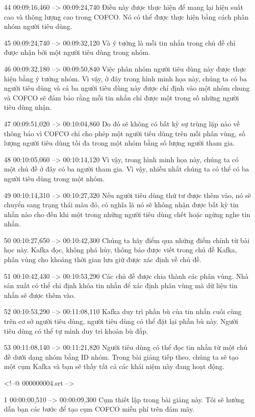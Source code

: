 44
00:09:16,460 --> 00:09:24,740
Điều này được thực hiện để mang lại hiệu suất cao và thông lượng cao trong COFCO.  Nó có thể được thực hiện bằng cách phân nhóm người tiêu dùng.

45
00:09:24,740 --> 00:09:32,120
Và ý tưởng là mỗi tin nhắn trong chủ đề chỉ được nhận bởi một người tiêu dùng trong nhóm.

46
00:09:32,180 --> 00:09:50,840
Việc phân nhóm người tiêu dùng này được thực hiện bằng ý tưởng nhóm.  Vì vậy, ở đây trong hình minh họa này, chúng ta có ba người tiêu dùng và cả ba người tiêu dùng này được chỉ định vào một nhóm chung và COFCO sẽ đảm bảo rằng mỗi tin nhắn chỉ được một trong số những người tiêu dùng nhận.

47
00:09:51,020 --> 00:10:04,860
Do đó sẽ không có bất kỳ sự trùng lặp nào về thông báo vì COFCO chỉ cho phép một người tiêu dùng trên mỗi phân vùng, số lượng người tiêu dùng tối đa trong một nhóm bằng số lượng người tham gia.

48
00:10:05,060 --> 00:10:14,120
Vì vậy, trong hình minh họa này, chúng ta có một chủ đề ở đây có ba người tham gia.  Vì vậy, nhiều nhất chúng ta có thể có ba người tiêu dùng trong một nhóm.

49
00:10:14,310 --> 00:10:27,320
Nếu người tiêu dùng thứ tư được thêm vào, nó sẽ chuyển sang trạng thái màu đỏ, có nghĩa là nó sẽ không nhận được bất kỳ tin nhắn nào cho đến khi một trong những người tiêu dùng chết hoặc ngừng nghe tin nhắn.

50
00:10:27,650 --> 00:10:42,300
Chúng ta hãy điểm qua những điểm chính từ bài học này.  Kafka đọc, không phá hủy, thông báo được viết trong chủ đề Kafka, phân vùng cho khoảng thời gian lưu giữ được xác định về chủ đề.

51
00:10:42,430 --> 00:10:53,290
Các chủ đề được chia thành các phân vùng.  Nhà sản xuất có thể chỉ định khóa tin nhắn để xác định phân vùng mà dữ liệu tin nhắn sẽ được thêm vào.

52
00:10:53,290 --> 00:11:08,110
Kafka duy trì phần bù của tin nhắn cuối cùng trên cơ sở người tiêu dùng, người tiêu dùng có thể đặt lại phần bù này.  Người tiêu dùng có thể tự mình duy trì khoản bù đắp.

53
00:11:08,140 --> 00:11:21,820
Người tiêu dùng có thể đọc tin nhắn từ một chủ đề dưới dạng nhóm bằng ID nhóm.  Trong bài giảng tiếp theo, chúng ta sẽ tạo một cụm Kafka và bạn sẽ thấy tất cả các khái niệm này đang hoạt động.

<!--@ 000000004.srt -->

1
00:00:00,510 --> 00:00:09,300
Cụm thiết lập trong bài giảng này.  Tôi sẽ hướng dẫn bạn các bước để tạo cụm COFCO miễn phí trên đám mây.

